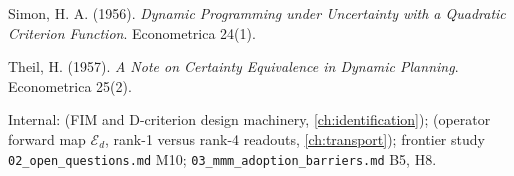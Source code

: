 \begin{enumerate}[label={[\arabic*]},leftmargin=2.5em]
\item Simon, H. A. (1956). \emph{Dynamic Programming under Uncertainty with a Quadratic Criterion Function}. Econometrica 24(1).
\item Theil, H. (1957). \emph{A Note on Certainty Equivalence in Dynamic Planning}. Econometrica 25(2).
\item Internal:  (FIM and D-criterion design machinery, \cref{ch:identification});  (operator forward map $\mathcal E_d$, rank-1 versus rank-4 readouts, \cref{ch:transport}); frontier study \texttt{02\_open\_questions.md} M10; \texttt{03\_mmm\_adoption\_barriers.md} B5, H8.
\end{enumerate}
\endgroup
